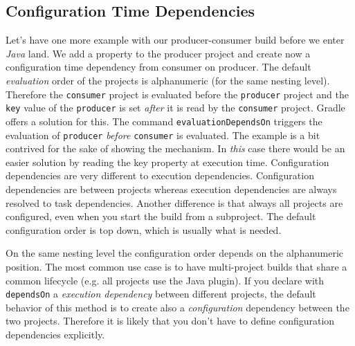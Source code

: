 \subsection{Configuration Time Dependencies} %
\label{sub:configuration_time_dependencies}
Let's have one more example with our producer-consumer build before we enter \emph{Java} land. We add a property to the producer project and create now a configuration time dependency from consumer on producer. 
The default \emph{evaluation} order of the projects is alphanumeric (for the same nesting level). Therefore the \texttt{consumer} project is evaluated before the \texttt{producer} project and the \texttt{key} value of the \texttt{producer} is set \emph{after} it is read by the \texttt{consumer} project. Gradle offers a solution for this. 
The command \texttt{evaluationDependsOn} triggers the evaluation of \texttt{producer} \emph{before} \texttt{consumer} is evaluated.
The example is a bit contrived for the sake of showing the mechanism. In \emph{this} case there would be an easier solution by reading the key property at execution time.
Configuration dependencies are very different to execution dependencies. Configuration dependencies are between projects whereas execution dependencies are always resolved to task dependencies. Another difference is that always all projects are configured, even when you start the build from a subproject. The default configuration order is top down, which is usually what is needed. 

On the same nesting level the configuration order depends on the alphanumeric position. The most common use case is to have multi-project builds that share a common lifecycle (e.g. all projects use the Java plugin). If you declare with \texttt{dependsOn} a \emph{execution dependency} between different projects, the default behavior of this method is to create also a \emph{configuration} dependency between the two projects. Therefore it is likely that you don't have to define configuration dependencies explicitly. 

